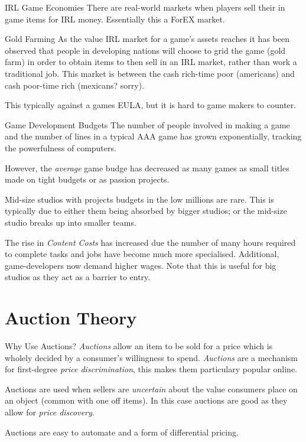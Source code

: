 \documentclass[11pt,a4paper]{article}
\begin{document}
  \begin{remark}{IRL Game Economies}
    There are real-world markets when players sell their in game items for IRL money. Essentially this a ForEX market.
  \end{remark}

  \begin{remark}{Gold Farming}
    As the value IRL market for a game's assets reaches it has been observed that people in developing nations will choose to grid the game (gold farm) in order to obtain items to then sell in an IRL market, rather than work a traditional job. This market is between the cash rich-time poor (americans) and cash poor-time rich (mexicans? sorry).
    \par This typically against a games EULA, but it is hard to game makers to counter.
  \end{remark}

  \begin{remark}{Game Development Budgets}
    The number of people involved in making a game and the number of lines in a typical AAA game has grown exponentially, tracking the powerfulness of computers.
    \par However, the \textit{average} game budge has decreased as many games as small titles made on tight budgets or as passion projects.
    \par Mid-size studios with projects budgets in the low millions are rare. This is typically due to either them being absorbed by bigger studios; or the mid-size studio breaks up into smaller teams.
    \par The rise in \textit{Content Costs} has increased due the number of many hours required to complete tasks and jobs have become much more specialised. Additional, game-developers now demand higher wages. Note that this is useful for big studios as they act as a barrier to entry.
  \end{remark}

\section{Auction Theory}

  \begin{remark}{Why Use Auctions?}
    \textit{Auctions} allow an item to be sold for a price which is wholely decided by a consumer's willingness to spend. \textit{Auctions} are a mechanism for first-degree \textit{price discrimination}, this makes them particulary popular online.
    \par Auctions are used when sellers are \textit{uncertain} about the value consumers place on an object (common with one off items). In this case auctions are good as they allow for \textit{price discovery}.
    \par Auctions are easy to automate and a form of differential pricing.
  \end{remark}
\end{document}
